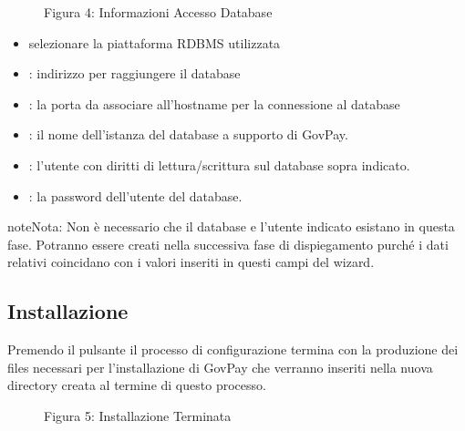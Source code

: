 \documentclass[letterpaper,10pt,italian]{sphinxmanual}
\begin{document}
\begin{figure}[htbp]
\centering
\capstart

\noindent{}
\caption{Figura 4: Informazioni Accesso Database}\label{\detokenize{configurazione/index:id4}}\end{figure}
\begin{itemize}
\item {} 
 selezionare la piattaforma RDBMS utilizzata

\item {} 
: indirizzo per raggiungere il database

\item {} 
: la porta da associare all’hostname per la connessione al
database

\item {} 
: il nome dell’istanza del database a supporto di
GovPay.

\item {} 
: l’utente con diritti di lettura/scrittura sul database
sopra indicato.

\item {} 
: la password dell’utente del database.

\end{itemize}

\begin{sphinxadmonition}{note}{Nota:}
Non è necessario che il database e l’utente indicato esistano in questa fase. Potranno essere creati nella successiva fase di dispiegamento purché i dati relativi coincidano con i valori inseriti in questi campi del wizard.
\end{sphinxadmonition}


\subsection{Installazione}
\label{\detokenize{configurazione/index:installazione}}
Premendo il pulsante  il processo di configurazione termina
con la produzione dei files necessari per l’installazione di GovPay che
verranno inseriti nella nuova directory  creata al termine di
questo processo.

\begin{figure}[htbp]
\centering
\capstart

\noindent{}
\caption{Figura 5: Installazione Terminata}\label{\detokenize{configurazione/index:id5}}\end{figure}
\end{document}
